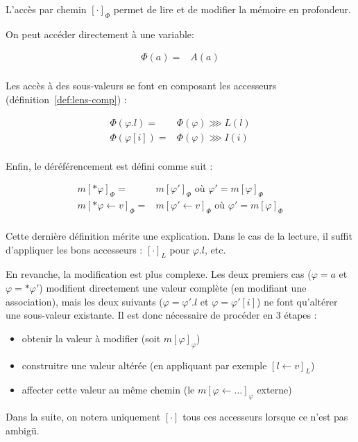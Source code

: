 \begin{definition}
  \label{def:acces-phi}

  L'accès par chemin $[\cdot]_Φ$ permet de lire et de modifier la mémoire en
  profondeur.

  On peut accéder directement à une variable:

  \begin{align*}
    Φ(a) = & A(a) \\
  \end{align*}

  Les accès à des sous-valeurs se font en composant les accesseurs
  (définition~\ref{def:lens-comp}) :

  \begin{align*}
    Φ(φ.l) = & Φ(φ) \ggg L(l) \\
    Φ(φ[i]) = & Φ(φ) \ggg I(i) \\
  \end{align*}

  Enfin, le déréférencement est défini comme suit :

  \begin{align*}
    m[*φ]_Φ       = & m[φ']_Φ \mbox{ où } φ' = m[φ]_Φ \\
    m[*φ ← v]_Φ   = & m[φ' ← v]_Φ \mbox{ où } φ' = m[φ]_Φ \\
  \end{align*}

\end{definition}

Cette dernière définition mérite une explication. Dans le cas de la lecture, il
suffit d'appliquer les bons accesseurs : $[\cdot]_L$ pour $φ.l$, etc.

En revanche, la modification est plus complexe. Les deux premiers cas ($φ = a$
et $φ = *φ'$) modifient directement une valeur complète (en modifiant une
association), mais les deux suivants ($φ = φ'.l$ et $φ = φ'[i]$) ne font
qu'altérer une sous-valeur existante. Il est donc nécessaire de procéder en 3
étapes :

\begin{itemize}
\item obtenir la valeur à modifier (soit $m[φ]_φ$)
\item construitre une valeur altérée (en appliquant par exemple $[l←v]_L$)
\item affecter cette valeur au même chemin (le $m[φ ← …]_φ$ externe)
\end{itemize}

Dans la suite, on notera uniquement $[\cdot]$ tous ces accesseurs lorsque ce
n'est pas ambigü.

